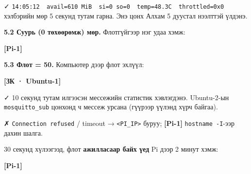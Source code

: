 ✓ \texttt{14:05:12\ \ avail=610\ MiB\ \ si=0\ so=0\ \ temp=48.3\textquotesingle{}C\ \ throttled=0x0} хэлбэрийн мөр 5 секунд тутам гарна. Энэ цонх Алхам 5 дуустал нээлттэй үлдэнэ.

\textbf{5.2 Суурь (0 төхөөрөмж) мөр.} Флотгүйгээр нэг удаа хэмж:

\textbf{{[}Pi-1{]}}

\begin{Shaded}
\begin{Highlighting}[]
\KeywordTok{|} 
\end{Highlighting}
\end{Shaded}

\textbf{5.3 Флот = 50.} Компьютер дээр флот эхлүүл:

\textbf{{[}ЗК · Ubuntu-1{]}}

\begin{Shaded}
\begin{Highlighting}[]
\KeywordTok{\&\&} 
\OperatorTok{\textless{}}\OperatorTok{\textgreater{}}\KeywordTok{\textbackslash{}}
\end{Highlighting}
\end{Shaded}

✓ 10 секунд тутам илгээсэн мессежийн статистик хэвлэгдэнэ. Ubuntu-2-ын \texttt{mosquitto\_sub} цонхонд ч мессеж урсана (гүүрээр үүлэнд хүрч байгаа).

✗ \texttt{Connection\ refused} / timeout → \texttt{\textless{}PI\_\allowbreak{}IP\textgreater{}} буруу; \textbf{{[}Pi-1{]}} \texttt{hostname\ -I}-ээр дахин шалга.

30 секунд хүлээгээд, флот \textbf{ажилласаар байх үед} Pi дээр 2 минут хэмж:

\textbf{{[}Pi-1{]}}

\begin{Shaded}
\begin{Highlighting}[]
\KeywordTok{|} 
\end{Highlighting}
\end{Shaded}

